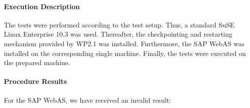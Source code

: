 \paragraph{Execution Description}
The tests were performed according to the test setup. Thus, a standard SuSE Linux Enterprise 10.3 was used. Thereafter, the checkpointing and restarting mechanism provided by WP2.1 was installed. Furthermore, the SAP WebAS was installed on the corresponding single machine. Finally, the tests were executed on the prepared machine.

\paragraph{Procedure Results}
For the SAP WebAS, we have received an invalid result:
